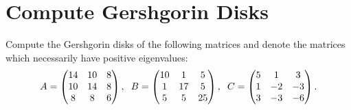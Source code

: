 \section{Compute Gershgorin Disks}
Compute the Gershgorin disks of the following matrices and denote the matrices which necessarily have positive eigenvalues:
\label{ex:gershgorin_home}
\begin{align*}
A=\begin{pmatrix}
14&10&8\\
10&14&8\\
8&8&6
\end{pmatrix}, \hspace{.2cm}
B=\begin{pmatrix}
10&1&5\\
1&17&5\\
5&5&25
\end{pmatrix}, \hspace{.2cm}
C=\begin{pmatrix}
5&1&3\\
1&-2&-3\\
3&-3&-6
\end{pmatrix}.
\end{align*}